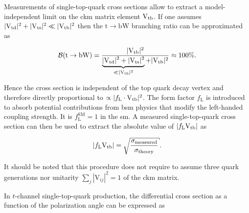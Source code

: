 
Measurements of single-top-quark cross sections allow to extract a model-independent limit on the \gls{ckm} matrix element ${\mathrm{V}_\mathrm{tb}}$. If one assumes $|{\mathrm{V}_\mathrm{td}}|^2+|{\mathrm{V}_\mathrm{ts}}|^2\ll|{\mathrm{V}_\mathrm{tb}}|^2$ then the $\mathrm{t}\to\mathrm{bW}$ branching ratio can be approximated as

\begin{equation}
\mathcal{B}(\mathrm{t}\to\mathrm{bW})=\frac{|{\mathrm{V}_\mathrm{tb}}|^2}{\underbrace{|{\mathrm{V}_\mathrm{td}}|^2+|{\mathrm{V}_\mathrm{ts}}|^2}_{\ll|{\mathrm{V}_\mathrm{tb}}|^2}+|{\mathrm{V}_\mathrm{tb}}|^2}\approx 100\%.
\end{equation}

Hence the cross section is independent of the top quark decay vertex and therefore directly proportional to $\propto|f_\mathrm{L}\cdot{\mathrm{V}_\mathrm{tb}}|^2$. The form factor $f_\mathrm{L}$ is introduced to absorb potential contributions from \gls{bsm} physics that modify the left-handed coupling strength. It is $f_\mathrm{L}^\mathrm{SM}=1$ in the \gls{sm}. A measured single-top-quark cross section can then be used to extract the absolute value of $|f_\mathrm{L}{\mathrm{V}_\mathrm{tb}}|$ as

\begin{equation}
|f_\mathrm{L}\vtb|=\sqrt{\frac{\sigma_\mathrm{measured}}{\sigma_\mathrm{theory}}}.
\end{equation}

It should be noted that this procedure does not require to assume three quark generations nor unitarity $\sum_j|\mathrm{V}_{ij}|^2=1$ of the \gls{ckm} matrix.

In $t$-channel single-top-quark production, the differential cross section as a function of the polarization angle can be expressed as

